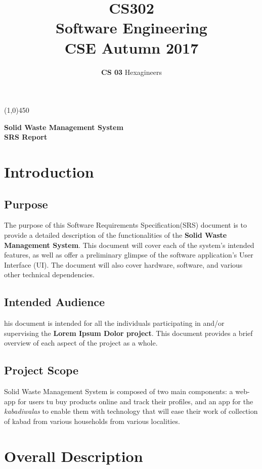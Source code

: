 \documentclass{article}
\title{\textbf{CS302}\\\HUGE Software Engineering\\
\LARGE CSE\hspace{\labelsep}\textbullet\hspace{\labelsep} Autumn 2017
}
\author{\textbf{CS 03} Hexagineers}
\begin{document}
\maketitle
\line(1,0){450}

\begin{center}

\Huge\textbf{Solid Waste Management System}\\
\Large \textbf{SRS Report}
\end{center}
\newpage
\tableofcontents
\newpage

\section{Introduction}
\subsection{Purpose}
The purpose of this Software Requirements Specification(SRS) document is to provide a 
detailed description of the functionalities of the \textbf{Solid Waste Management System}. This document will cover each of the  system’s intended  features,  as well  as offer a preliminary glimpse of the software application’s User Interface (UI). The document will also cover hardware, software, and various other technical dependencies. 

\subsection{Intended Audience} 
\par his  document  is  intended  for  all the individuals  participating  in  and/or supervising  the  \textbf{Lorem Ipsum Dolor project}. 
This document provides a brief overview of each aspect of the project as a whole. 

\subsection{Project Scope}
\par Solid Waste Management System is composed of two main components: a web-app for users tu buy products online and track their profiles, and an app for the \textit{kabadiwalas} to enable them with technology that will ease their work of collection of kabad from various households from various localities.
\newpage

\section{Overall Description}
\end{document}
